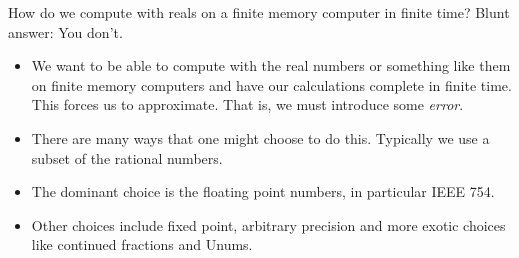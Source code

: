 \documentclass{beamer}
\begin{document}
\begin{frame}{How do we compute with reals on a finite memory computer in finite time?}
Blunt answer: You don't.
\begin{itemize}
\item We want to be able to compute with the real numbers or something like them on finite memory computers and 
have our calculations complete in finite time. This forces us to approximate. That is, we must introduce
some \emph{error}. \\
\item There are many ways that one might choose to do this. Typically we use a subset of
the rational numbers. \\
\item The dominant choice is the floating point numbers, in particular IEEE 754. \\
\item Other choices include fixed point, arbitrary precision and more exotic choices like continued
			fractions and Unums.
\end{itemize}
\end{frame}


\end{document}
